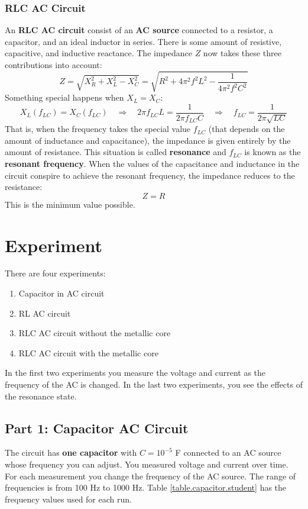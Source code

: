 \subsubsection{RLC AC Circuit}
%
An \textbf{RLC AC circuit} consist of an \textbf{AC source} connected to a resistor, a capacitor, and an ideal inductor in series. There is some amount of resistive, capacitive, and inductive reactance. The impedance $Z$ now takes these three contributions into account:
\begin{equation} \label{eq.06.eq.06.impedance.RLC}
	Z = \sqrt{X_{R}^{2} + X_{L}^{2} - X_{C}^{2}} = \sqrt{R^{2} + 4 \pi^{2} f^{2} L^{2} - \frac{1}{4 \pi^{2} f^{2} C^{2}}}
\end{equation}
Something special happens when $X_{L} = X_{C}$:
\begin{equation} \label{eq.06.resonant.frequency}
	X_{L}(f_{LC}) = X_{C}(f_{LC}) \quad \Longrightarrow \quad 2\pi f_{LC} L = \frac{1}{2\pi f_{LC} C} \quad \Longrightarrow \quad f_{LC} = \frac{1}{2 \pi \sqrt{LC}}
\end{equation}
That is, when the frequency takes the special value $f_{LC}$ (that depends on the amount of inductance and capacitance), the impedance is given entirely by the amount of resistance. This situation is called \textbf{resonance} and $f_{LC}$ is known as the \textbf{resonant frequency}. When the values of the capacitance and inductance in the circuit conspire to achieve the resonant frequency, the impedance reduces to the resistance:
\begin{equation}
	Z = R
\end{equation}
This is the minimum value possible.
%
\section{Experiment}
%
There are four experiments:
\begin{enumerate}
	\item Capacitor in AC circuit
	\item RL AC circuit
	\item RLC AC circuit without the metallic core
	\item RLC AC circuit with the metallic core
\end{enumerate}
In the first two experiments you measure the voltage and current as the frequency of the AC is changed. In the last two experiments, you see the effects of the resonance state.
%
\subsection{Part 1: Capacitor AC Circuit}
%
The circuit has \textbf{one capacitor} with $C = 10^{-5}$ F connected to an AC source whose frequency you can adjust. You measured voltage and current over time. For each measurement you change the frequency of the AC source. The range of frequencies is from 100 Hz to 1000 Hz. Table \ref{table.capacitor.student} has the frequency values used for each run.

